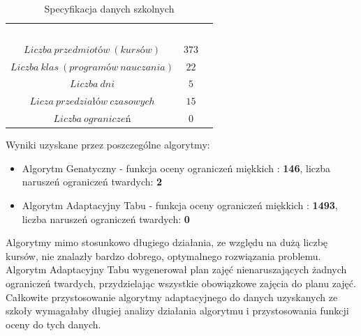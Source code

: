 \begin{table}[H]
\begin{center}
\begin{tabular}{ |c|c|c| }
\multicolumn{1}{r}{}
 &  \multicolumn{1}{c}{$$}
 & \multicolumn{1}{c}{$$} 
 \\
\cline{1-2}
$Liczba\ przedmiotów\ (kursów)$ & $373$\\
\cline{1-2}
$Liczba\ klas\ (programów\ nauczania)$ & $22$\\
\cline{1-2}
$Liczba\ dni$ & $5$ \\
\cline{1-2}
$Licza\ przedziałów\ czasowych$ & $15$ \\
\cline{1-2}
$Liczba\ ograniczeń$ & $0$ \\
\cline{1-2}
\end{tabular}
\end{center}
\caption {Specyfikacja danych szkolnych}
\end{table}
Wyniki uzyskane przez poszczególne algorytmy:
\begin{itemize}
\item Algorytm Genatyczny - funkcja oceny ograniczeń miękkich : \textbf{146}, liczba naruszeń ograniczeń twardych: \textbf{2}
\item Algorytm Adaptacyjny Tabu - funkcja oceny ograniczeń miękkich : \textbf{1493}, liczba naruszeń ograniczeń twardych: \textbf{0}
\end{itemize}
Algorytmy mimo stosunkowo długiego działania, ze względu na dużą liczbę kursów, nie znalazły bardzo dobrego, optymalnego rozwiązania problemu. Algorytm Adaptacyjny Tabu wygenerował plan zajęć nienaruszających żadnych ograniczeń twardych, przydzielając wszystkie obowiązkowe zajęcia do planu zajęć. Całkowite przystosowanie algorytmy adaptacyjnego do danych uzyskanych ze szkoły wymagałaby długiej analizy działania algorytmu i przystosowania funkcji oceny do tych danych.


